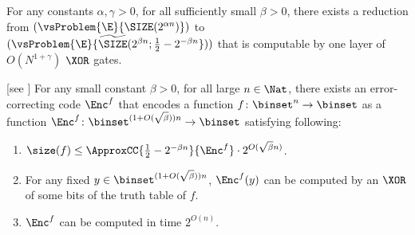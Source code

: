 \documentclass{toc}
\begin{document}
\begin{theorem}
  \label{thm_ECCReduction}
  For any constants $\alpha, \gamma > 0$,
  for all sufficiently small $\beta > 0$,
  there exists
  a reduction from
  $(\vsProblem{\E}{{\SIZE}(2^{\alpha n})})$
  to
  $(\vsProblem{\E}{\widetilde{\SIZE}(2^{\beta n}; \frac{1}{2} - 2^{-\beta n}}))$
  that is computable by one layer of $O(N^{1 + \gamma})$ $\XOR$ gates.
\end{theorem}

\begin{lemma}
  [see   %
    \cite{SudanTV01_jcss_journals, Vadhan12_fttcs_journals, Yekhanin12_fttcs_journals}]
  \label{lemma_ECC}
  For any small constant $\beta > 0$,
  for all large $n \in \Nat$,
  there exists an error-correcting code $\Enc^f$
  that encodes a function $f \colon \binset^n \to \binset$
  as a function $\Enc^f \colon \binset^{(1 + O(\sqrt{\beta})) n} \to \binset$
  satisfying following:
  \begin{enumerate}
    \item
          $\size(f) \le
            \ApproxCC{\frac{1}{2} - 2^{-\beta n}}{\Enc^f}
            \cdot 2^{O(\sqrt{\beta} n)}$.
    \item
          For any fixed $y \in \binset^{(1 + O(\sqrt{\beta})) n}$,
          $\Enc^f(y)$ can be computed by an $\XOR$ of some bits of the truth table of $f$.
    \item
          $\Enc^f$ can be computed in time $2^{O(n)}$.
  \end{enumerate}
\end{lemma}
\end{document}
